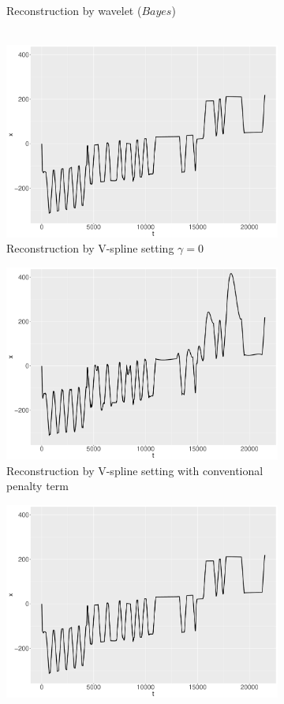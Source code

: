 \begin{figure}
\begin{subfigure}{0.45\textwidth}
    \caption{Reconstruction by wavelet ($\textit{Bayes}$)\\ \mbox{  }}\label{ggRealdataXBayes}
    \end{subfigure}
    \begin{subfigure}{0.45\textwidth}
    \centering
    \includegraphics[width=\textwidth,height=0.5\textwidth]{Chapters/02TractorSplineTheory/plot/ggplot/ggRealdataXTractorGamma.pdf}
    \caption{Reconstruction by V-spline setting  $\gamma=0$ }\label{ggRealdataXTractorGamma}
    \end{subfigure}
    \begin{subfigure}{0.45\textwidth}
    \centering
    \includegraphics[width=\textwidth,height=0.5\textwidth]{Chapters/02TractorSplineTheory/plot/ggplot/ggRealdataXTractorAPT.pdf}
    \caption{Reconstruction by V-spline setting with conventional penalty term}\label{ggRealdataXTractorAPT}
    \end{subfigure}
    \begin{subfigure}{0.45\textwidth}
    \centering
    \includegraphics[width=\textwidth,height=0.5\textwidth]{Chapters/02TractorSplineTheory/plot/ggplot/ggRealdataXTractor.pdf}

\end{subfigure}
\end{figure}
